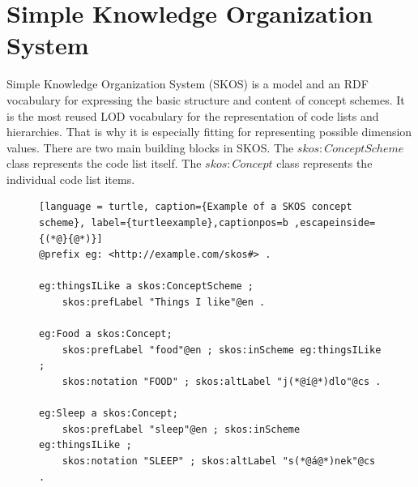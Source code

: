 \section{Simple Knowledge Organization System\label{skos}}

Simple Knowledge Organization System (SKOS) is a model and an RDF vocabulary for expressing the basic structure and content of concept schemes.\cite{skos} It is the most reused LOD vocabulary for the representation of code lists and hierarchies. That is why it is especially fitting for representing possible dimension values. There are two main building blocks in SKOS. The $skos:ConceptScheme$ class represents the code list itself. The $skos:Concept$ class represents the individual code list items.

\begin{figure}[h]
\begin{lstlisting}[language = turtle, caption={Example of a SKOS concept scheme}, label={turtleexample},captionpos=b ,escapeinside={(*@}{@*)}]
@prefix eg: <http://example.com/skos#> .

eg:thingsILike a skos:ConceptScheme ; 
    skos:prefLabel "Things I like"@en .

eg:Food a skos:Concept;
    skos:prefLabel "food"@en ; skos:inScheme eg:thingsILike ;
    skos:notation "FOOD" ; skos:altLabel "j(*@í@*)dlo"@cs .

eg:Sleep a skos:Concept;
    skos:prefLabel "sleep"@en ; skos:inScheme eg:thingsILike ;
    skos:notation "SLEEP" ; skos:altLabel "s(*@á@*)nek"@cs .
\end{lstlisting}
\end{figure}

